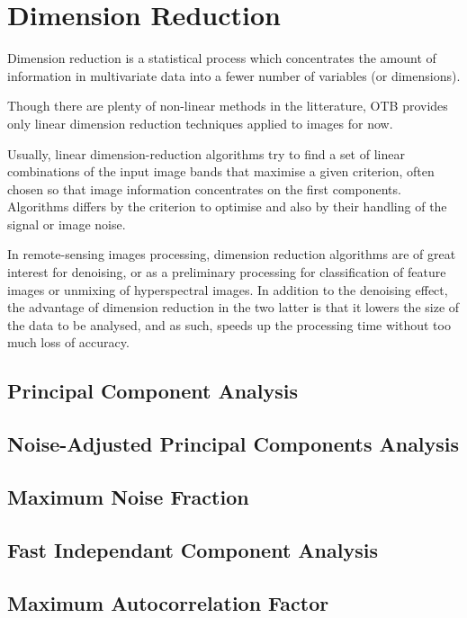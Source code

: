 \chapter{Dimension Reduction}\label{chap:dimred}

Dimension reduction is a statistical process which concentrates the
amount of information in multivariate data into a fewer number of
variables (or dimensions).

Though there are plenty of non-linear methods in the litterature, OTB
provides only linear dimension reduction techniques applied to images for now.

Usually, linear dimension-reduction algorithms try to find a set of
linear combinations of the input image bands that maximise a given
criterion, often chosen so that image information concentrates on the
first components. Algorithms differs by the criterion to optimise and
also by their handling of the signal or image noise.

In remote-sensing images processing, dimension reduction algorithms
are of great interest for denoising, or as a preliminary processing
for classification of feature images or unmixing of hyperspectral
images. In addition to the denoising effect, the advantage of
dimension reduction in the two latter is that it lowers the size of
the data to be analysed, and as such, speeds up the processing time
without too much loss of accuracy.

\section{Principal Component Analysis}



\section{Noise-Adjusted Principal Components Analysis}



\section{Maximum Noise Fraction}



\section{Fast Independant Component Analysis}



\section{Maximum Autocorrelation Factor}




